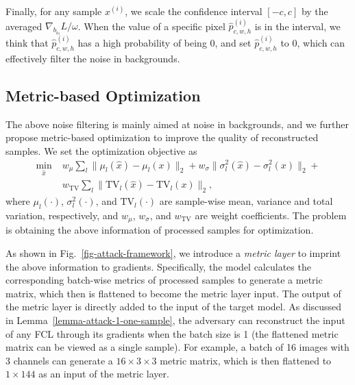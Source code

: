 \documentclass[lettersize,journal]{IEEEtran}
\begin{document}
Finally, for any sample $x^{(i)}$, we scale the confidence interval $\left[-c, c\right]$ by the averaged $\nabla_{b_{i_0}} L / \omega$. When the value of a specific pixel $\hat{p}^{(i)}_{c,w,h}$ is in the interval, we think that $\hat{p}^{(i)}_{c,w,h}$ has a high probability of being 0, and set $\hat{p}^{(i)}_{c,w,h}$ to 0, which can effectively filter the noise in backgrounds.

\subsection{Metric-based Optimization}
\label{section-mectics-optimization}

The above noise filtering is mainly aimed at noise in backgrounds, and we further propose metric-based optimization to improve the quality of reconstructed samples. We set the optimization objective as
\begin{align}
\label{optimization-goal}
\underset{\hat{x}}{\min} & \; w_\mu \sum_l \|\mu_l\left(\hat{x}\right) - \mu_l\left(x\right)\|_2 +  w_\sigma \|\sigma_l^2\left(\hat{x}\right) - \sigma_l^2\left(x\right)\|_2 + \nonumber \\ & \; w_{\mathrm{TV}} \sum_l \| \mathrm{TV}_l\left(\hat{x}\right) - \mathrm{TV}_l\left(x\right) \|_2,
\end{align}
where $\mu_l\left(\cdot\right)$, $\sigma_l^2\left(\cdot\right)$, and $\mathrm{TV}_l\left(\cdot\right)$ are sample-wise mean, variance and total variation, respectively, and $w_\mu$, $w_\sigma$, and $w_{\mathrm{TV}}$ are weight coefficients. The problem is obtaining the above information of processed samples for optimization.

As shown in Fig.~\ref{fig-attack-framework}, we introduce a \textit{metric layer} to imprint the above information to gradients. Specifically, the model calculates the corresponding batch-wise metrics of processed samples to generate a metric matrix, which then is flattened to become the metric layer input. The output of the metric layer is directly added to the input of the target model. As discussed in Lemma~\ref{lemma-attack-1-one-sample}, the adversary can reconstruct the input of any FCL through its gradients when the batch size is 1 (the flattened metric matrix can be viewed as a single sample). For example, a batch of 16 images with 3 channels can generate a $16 \times 3 \times 3$ metric matrix, which is then flattened to $1\times 144$ as an input of the metric layer.
\end{document}

